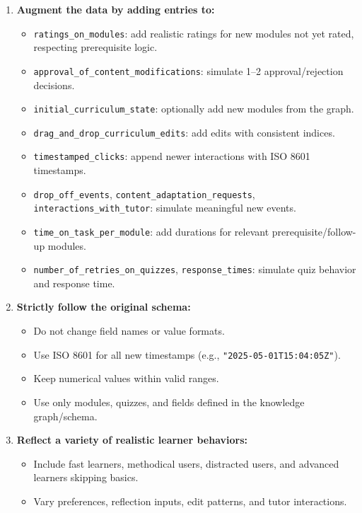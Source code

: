 \begin{tcolorbox}[colback=gray!5!white, colframe=black!60!black, title=Prompt: Data Augmentation]
{\begin{enumerate}
  \item \textbf{Augment the data by adding entries to:}
  \begin{itemize}
    \item \texttt{ratings\_on\_modules}: add realistic ratings for new modules not yet rated, respecting prerequisite logic.
    \item \texttt{approval\_of\_content\_modifications}: simulate 1--2 approval/rejection decisions.
    \item \texttt{initial\_curriculum\_state}: optionally add new modules from the graph.
    \item \texttt{drag\_and\_drop\_curriculum\_edits}: add edits with consistent indices.
    \item \texttt{timestamped\_clicks}: append newer interactions with ISO 8601 timestamps.
    \item \texttt{drop\_off\_events}, \texttt{content\_adaptation\_requests}, \texttt{interactions\_with\_tutor}: simulate meaningful new events.
    \item \texttt{time\_on\_task\_per\_module}: add durations for relevant prerequisite/follow-up modules.
    \item \texttt{number\_of\_retries\_on\_quizzes}, \texttt{response\_times}: simulate quiz behavior and response time.
  \end{itemize}

  \item \textbf{Strictly follow the original schema:}
  \begin{itemize}
    \item Do not change field names or value formats.
    \item Use ISO 8601 for all new timestamps (e.g., \texttt{"2025-05-01T15:04:05Z"}).
    \item Keep numerical values within valid ranges.
    \item Use only modules, quizzes, and fields defined in the knowledge graph/schema.
  \end{itemize}

  \item \textbf{Reflect a variety of realistic learner behaviors:}
  \begin{itemize}
    \item Include fast learners, methodical users, distracted users, and advanced learners skipping basics.
    \item Vary preferences, reflection inputs, edit patterns, and tutor interactions.
  \end{itemize}


\end{enumerate}}
\end{tcolorbox}
